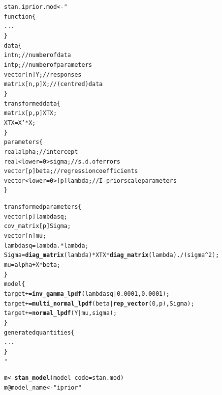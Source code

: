 \documentclass[]{beamer}\usepackage[]{graphicx}\usepackage[]{color}
\makeatletter
\newcommand{\hlstr}[1]{\textcolor[rgb]{0.192,0.494,0.8}{#1}}%
\newcommand{\hlopt}[1]{\textcolor[rgb]{0,0,0}{#1}}%
\newcommand{\hlstd}[1]{\textcolor[rgb]{0.345,0.345,0.345}{#1}}%
\newcommand{\hlkwb}[1]{\textcolor[rgb]{0.69,0.353,0.396}{#1}}%
\newcommand{\hlkwc}[1]{\textcolor[rgb]{0.333,0.667,0.333}{#1}}%
\newcommand{\hlkwd}[1]{\textcolor[rgb]{0.737,0.353,0.396}{\textbf{#1}}}%
\newenvironment{kframe}{%
 \def\at@end@of@kframe{}%
 \ifinner\ifhmode%
  \def\at@end@of@kframe{\end{minipage}}%
  \begin{minipage}{\columnwidth}%
 \fi\fi%
 \def\FrameCommand##1{\hskip\@totalleftmargin \hskip-\fboxsep
 \colorbox{shadecolor}{##1}\hskip-\fboxsep
     \hskip-\linewidth \hskip-\@totalleftmargin \hskip\columnwidth}%
 \MakeFramed {\advance\hsize-\width
   \@totalleftmargin\z@ \linewidth\hsize
   \@setminipage}}%
 {\par\unskip\endMakeFramed%
 \at@end@of@kframe}
\newenvironment{knitrout}{}{} %
\makeatother
\begin{document}
\newsavebox{\stana}
\begin{lrbox}{\stana}
\begin{knitrout}\footnotesize
{}\color{fgcolor}\begin{kframe}
\begin{alltt}
stan.iprior.mod <- "
  function \{
    ...
  \}
  data \{
    int n; // number of data
    int p; // number of parameters
    vector[n] Y; // responses
    matrix[n, p] X; // (centred) data
  \}
  transformed data \{
    matrix[p, p] XTX;
    XTX = X' * X;
  \}
  parameters \{
    real alpha;  // intercept
    real<lower=0> sigma;  // s.d. of errors
    vector[p] beta;  // regression coefficients
    vector<lower=0>[p] lambda;  // I-prior scale parameters
  \}
\end{alltt}
\end{kframe}
\end{knitrout}
\end{lrbox}

\newsavebox{\stanb}
\begin{lrbox}{\stanb}
\begin{knitrout}\footnotesize
{}\color{fgcolor}\begin{kframe}
\begin{alltt}
transformed parameters \{
  vector[p] lambdasq;
  cov_matrix[p] Sigma;
  vector[n] mu;
  lambdasq = lambda .* lambda;
  Sigma = \hlkwd{diag_matrix}(lambda) * XTX * \hlkwd{diag_matrix}(lambda) ./ (sigma ^ 2);
  mu = alpha + X * beta;
\}
model \{
  target += \hlkwd{inv_gamma_lpdf}(lambdasq | 0.0001, 0.0001);
  target += \hlkwd{multi_normal_lpdf}(beta | \hlkwd{rep_vector}(0, p), Sigma);
  target += \hlkwd{normal_lpdf}(Y | mu, sigma);
\}
generated quantities \{
  ...
\}
"
\end{alltt}
\end{kframe}
\end{knitrout}
\end{lrbox}



\newsavebox{\stancomp}
\begin{lrbox}{\stancomp}
\begin{knitrout}\small
{}\color{fgcolor}\begin{kframe}
\begin{alltt}
\hlstd{m} \hlkwb{<-} \hlkwd{stan_model}\hlstd{(}\hlkwc{model_code} \hlstd{= stan.mod)}
\hlstd{m}\hlopt{@}\hlkwc{model_name} \hlkwb{<-} \hlstr{"iprior"}
\end{alltt}
\end{kframe}
\end{knitrout}
\end{lrbox}
\end{document}
